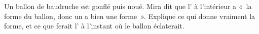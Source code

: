 \begin{exercise}[$\star\star$]\label{exo:g3:solids-liquids-gases:11}
Un ballon de baudruche est gonflé puis noué. Mira dit que l' à
l'intérieur a «~la forme du ballon, donc un  a bien une forme~».
Explique ce qui donne vraiment la forme, et ce que ferait l' à
l'instant où le ballon éclaterait.
\end{exercise}

